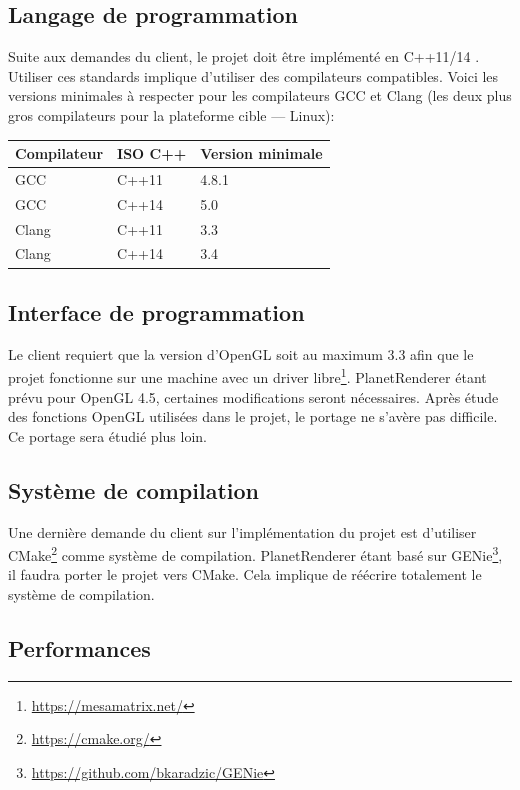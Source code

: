 \subsection{Langage de programmation}

Suite aux demandes du client, le projet doit être implémenté en C++11/14
. Utiliser ces standards implique d'utiliser des compilateurs
compatibles. Voici les versions minimales à respecter pour les
compilateurs GCC et Clang (les deux plus gros compilateurs pour la
plateforme cible --- Linux):

\begin{longtable}[]{@{}lll@{}}
\toprule
Compilateur & ISO C++ & Version minimale\tabularnewline
\midrule
\endhead
GCC & C++11 & 4.8.1\tabularnewline
GCC & C++14 & 5.0\tabularnewline
Clang & C++11 & 3.3\tabularnewline
Clang & C++14 & 3.4\tabularnewline
\bottomrule
\end{longtable}

\subsection{Interface de programmation}

Le client requiert que la version d'OpenGL soit au maximum 3.3
afin que le projet fonctionne sur une machine avec un driver libre\footnote{\url{https://mesamatrix.net/}}.
PlanetRenderer étant prévu pour OpenGL 4.5, certaines modifications
seront nécessaires. Après étude des fonctions OpenGL utilisées dans le
projet, le portage ne s'avère pas difficile. Ce portage sera étudié plus
loin.

\subsection{Système de compilation}

Une dernière demande du client sur l'implémentation du projet est
d'utiliser CMake\footnote{\url{https://cmake.org/}} comme système de
compilation. PlanetRenderer étant basé sur GENie\footnote{\url{https://github.com/bkaradzic/GENie}},
il faudra porter le projet vers CMake. Cela implique de réécrire
totalement le système de compilation.

\subsection{Performances}

